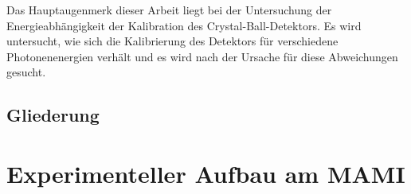 \documentclass[a4paper,11pt,oneside,final,german,openbib,pdftex]{scrbook}
\begin{document}
{Das Hauptaugenmerk dieser Arbeit liegt bei der Untersuchung der Energieabh\"angigkeit der Kalibration des Crystal-Ball-Detektors. Es wird untersucht, wie sich die Kalibrierung des Detektors f\"ur verschiedene Photonenenergien verh\"alt und es wird nach der Ursache f\"ur diese Abweichungen gesucht. 
\newline	 
	
	
\section{Gliederung}






\chapter{Experimenteller Aufbau am MAMI}





}
\end{document}
